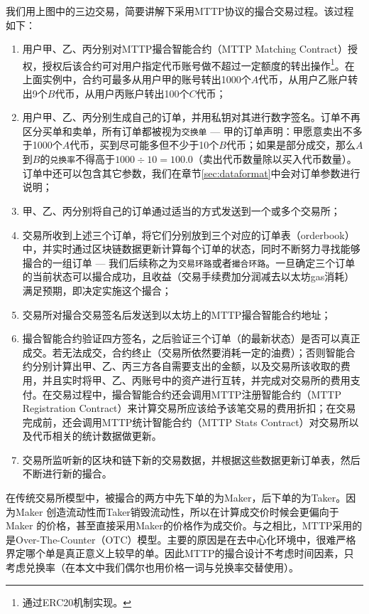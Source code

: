 \documentclass[UTF8,nofonts]{ctexart}
\begin{document}
我们用上图中的三边交易，简要讲解下采用MTTP协议的撮合交易过程。该过程如下：

\begin{enumerate}
	\item 用户甲、乙、丙分别对MTTP撮合智能合约（MTTP Matching Contract）授权，授权后该合约可对用户指定代币账号做不超过一定额度的转出操作\footnote{通过ERC20机制实现。}。在上面实例中，合约可最多从用户甲的账号转出1000个$A$代币，从用户乙账户转出9个$B$代币，从用户丙账户转出100个$C$代币；
	\item 用户甲、乙、丙分别生成自己的订单，并用私钥对其进行数字签名。订单不再区分买单和卖单，所有订单都被视为\texttt{交换单} --- 甲的订单声明：甲愿意卖出不多于1000个$A$代币，买到尽可能多但不少于10个$B$代币；如果是部分成交，那么$A$到$B$的\texttt{兑换率}不得高于$1000\div10 = 100.0$（卖出代币数量除以买入代币数量）。订单中还可以包含其它参数，我们在章节\ref{sec:dataformat}中会对订单参数进行说明；
	\item 甲、乙、丙分别将自己的订单通过适当的方式发送到一个或多个交易所；
	\item 交易所收到上述三个订单，将它们分别放到三个对应的订单表（orderbook）中，并实时通过区块链数据更新计算每个订单的状态，同时不断努力寻找能够撮合的一组订单 --- 我们后续称之为\texttt{交易环路}或者\texttt{撮合环路}。一旦确定三个订单的当前状态可以撮合成功，且收益（交易手续费加分润减去以太坊gas消耗）满足预期，即决定实施这个撮合；
	\item 交易所对撮合交易签名后发送到以太坊上的MTTP撮合智能合约地址；
	\item 撮合智能合约验证四方签名，之后验证三个订单（的最新状态）是否可以真正成交。若无法成交，合约终止（交易所依然要消耗一定的油费）；否则智能合约分别计算出甲、乙、丙三方各自需要支出的金额，以及交易所该收取的费用，并且实时将甲、乙、丙账号中的资产进行互转，并完成对交易所的费用支付。在交易过程中，撮合智能合约还会调用MTTP注册智能合约（MTTP Registration Contract）来计算交易所应该给予该笔交易的费用折扣；在交易完成前，还会调用MTTP统计智能合约（MTTP Stats Contract）对交易所以及代币相关的统计数据做更新。
	\item 交易所监听新的区块和链下新的交易数据，并根据这些数据更新订单表，然后不断进行新的撮合。
\end{enumerate}

在传统交易所模型中，被撮合的两方中先下单的为Maker，后下单的为Taker。因为Maker 创造流动性而Taker销毁流动性，所以在计算成交价时候会更偏向于Maker 的价格，甚至直接采用Maker的价格作为成交价。与之相比，MTTP采用的是Over-The-Counter（OTC）模型。主要的原因是在去中心化环境中，很难严格界定哪个单是真正意义上较早的单。因此MTTP的撮合设计不考虑时间因素，只考虑兑换率（在本文中我们偶尔也用价格一词与兑换率交替使用）。
\end{document}
